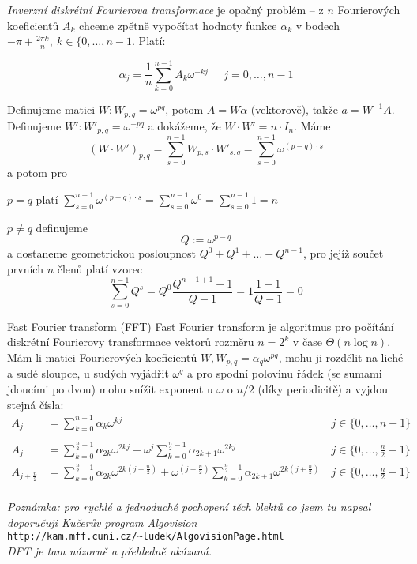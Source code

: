 \emph{Inverzní diskrétní Fourierova transformace} je opačný problém -- z $n$ Fourierových koeficientů $A_k$ chceme zpětně vypočítat hodnoty funkce $\alpha_k$ v bodech $-\pi + \frac{2\pi k}{n},\ k\in\{0,\dots,n-1$. Platí:

$$\alpha_j = \frac{1}{n}\sum_{k=0}^{n-1} A_k \omega^{-kj}  \;\;\;\;\; j = 0, \dots, n-1$$

\medskip
\begin{dukaz}
Definujeme matici $W: W_{p,q}=\omega^{pq}$, potom $A = W\alpha$ (vektorově), takže $a = W^{-1}A$. Definujeme $W': W'_{p,q}=\omega^{-pq}$ a dokážeme, že $W\cdot W'= n\cdot I_n$. Máme
$$(W\cdot W')_{p,q} = \sum_{s=0}^{n-1} W_{p,s}\cdot W'_{s,q} = \sum_{s=0}^{n-1} \omega^{(p-q)\cdot s}$$
a potom pro
\begin{pitemize}
    \item $p = q$ platí $\sum_{s=0}^{n-1}\omega^{(p-q)\cdot s} = \sum_{s=0}^{n-1}\omega^0 = \sum_{s=0}^{n-1} 1 = n$
    \item $p\neq q$ definujeme
    $$Q:= \omega^{p-q}$$
    a dostaneme geometrickou posloupnost $Q^0 + Q^1 +\dots +Q^{n-1}$, pro jejíž součet prvních $n$ členů platí vzorec
    $$ \sum_{s=0}^{n-1} Q^s = Q^0 \frac{Q^{n-1+1} - 1}{Q-1} = 1\frac{1-1}{Q-1}= 0 $$
\end{pitemize}
\end{dukaz}


\begin{algoritmusN}{Fast Fourier transform (FFT)}
Fast Fourier transform je algoritmus pro počítání diskrétní Fourierovy transformace vektorů rozměru $n=2^k$ v čase $\Theta(n\log n)$. Mám-li matici Fourierových koeficientů $W, W_{p,q} = \alpha_q \omega^{pq}$, mohu ji rozdělit na liché a sudé sloupce, u sudých vyjádřit $\omega^q$ a pro spodní polovinu řádek (se sumami jdoucími po dvou) mohu snížit exponent u $\omega$ o $n/2$ (díky periodicitě) a vyjdou stejná čísla:
\begin{align*}
    A_j &= \sum_{k=0}^{n-1} \alpha_k \omega^{kj}\ &j\in\{0,\dots,n-1\}\\
    \\
    A_j &= \sum_{k=0}^{\frac{n}{2}-1} \alpha_{2k}\omega^{2kj} + \omega^j \sum_{k=0}^{\frac{n}{2}-1} \alpha_{2k+1}\omega^{2kj}\ &j\in\{0,\dots,\frac{n}{2}-1\}\\    
    A_{j+\frac{n}{2}} &= \sum_{k=0}^{\frac{n}{2}-1} \alpha_{2k}\omega^{2k(j+\frac{n}{2})} + \omega^{(j+\frac{n}{2})} \sum_{k=0}^{\frac{n}{2}-1} \alpha_{2k+1}\omega^{2k(j+\frac{n}{2})}\ &j\in\{0,\dots,\frac{n}{2}-1\}\\
\end{align*}

\textit{Poznámka: pro rychlé a jednoduché pochopení těch blektů co jsem tu napsal doporučuji Kučerův program Algovision}\\ \texttt{http://kam.mff.cuni.cz/\~{}ludek/AlgovisionPage.html} \\ \textit{DFT je tam názorně a přehledně ukázaná.}
\end{algoritmusN}

